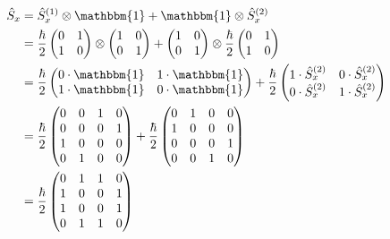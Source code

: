 \documentclass{article}
\begin{document}
\begin{enumerate}[label=(\alph*)]
  \begin{align*}
    \hat{S}_x &= \hat{S}_x^{(1)} \otimes \mathbbm{1} + \mathbbm{1} \otimes \hat{S}_x^{(2)} \\
    &= \frac{\hbar}{2} \begin{pmatrix}
      0 & 1 \\
      1 & 0
    \end{pmatrix} \otimes \begin{pmatrix}
      1 & 0 \\
      0 & 1
    \end{pmatrix} + \begin{pmatrix}
      1 & 0 \\
      0 & 1
    \end{pmatrix} \otimes \frac{\hbar}{2} \begin{pmatrix}
      0 & 1 \\
      1 & 0
    \end{pmatrix} \\
    &= \frac{\hbar}{2} \begin{pmatrix}
      0 \cdot \mathbbm{1} & 1 \cdot \mathbbm{1} \\
      1 \cdot \mathbbm{1} & 0 \cdot \mathbbm{1}
    \end{pmatrix} + \frac{\hbar}{2}
    \begin{pmatrix}
      1 \cdot \hat{S}_x^{(2)} & 0 \cdot \hat{S}_x^{(2)} \\
      0 \cdot \hat{S}_x^{(2)} & 1 \cdot \hat{S}_x^{(2)} \\
    \end{pmatrix} \\
    &= \frac{\hbar}{2} \begin{pmatrix}
      0 & 0 & 1 & 0 \\
      0 & 0 & 0 & 1 \\
      1 & 0 & 0 & 0 \\
      0 & 1 & 0 & 0
    \end{pmatrix} + \frac{\hbar}{2} \begin{pmatrix}
      0 & 1 & 0 & 0 \\
      1 & 0 & 0 & 0 \\
      0 & 0 & 0 & 1 \\
      0 & 0 & 1 & 0
    \end{pmatrix} \\
    &= \frac{\hbar}{2} \begin{pmatrix}
      0 & 1 & 1 & 0 \\
      1 & 0 & 0 & 1 \\
      1 & 0 & 0 & 1 \\
      0 & 1 & 1 & 0 \\
    \end{pmatrix}
  \end{align*}


\end{enumerate}
\end{document}
